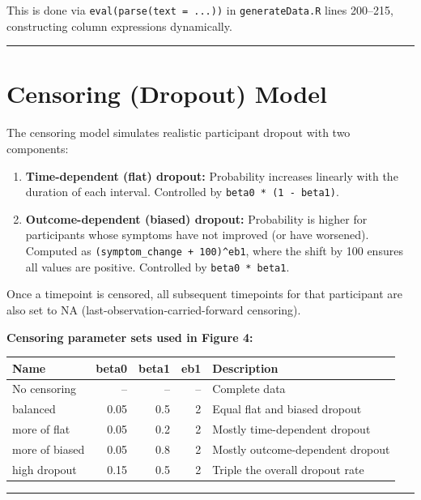 \documentclass[11pt]{article}
\begin{document}
This is done via \texttt{eval(parse(text = ...))} in \texttt{generateData.R}
lines 200--215, constructing column expressions dynamically.

\bigskip\noindent\rule{\textwidth}{0.4pt}\bigskip

\section{Censoring (Dropout) Model}

The censoring model simulates realistic participant dropout
with two components:

\begin{enumerate}
  \item \textbf{Time-dependent (flat) dropout:} Probability increases
    linearly with the duration of each interval. Controlled
    by \texttt{beta0 * (1 - beta1)}.
  \item \textbf{Outcome-dependent (biased) dropout:} Probability is
    higher for participants whose symptoms have not improved
    (or have worsened). Computed as \texttt{(symptom\_change + 100)\^{}eb1},
    where the shift by 100 ensures all values are positive.
    Controlled by \texttt{beta0 * beta1}.
\end{enumerate}

Once a timepoint is censored, all subsequent timepoints for that
participant are also set to NA (last-observation-carried-forward
censoring).

\textbf{Censoring parameter sets used in Figure 4:}

\begin{table}[h]
\centering
\begin{tabular}{lrrrl}
\toprule
Name & beta0 & beta1 & eb1 & Description \\
\midrule
No censoring & -- & -- & -- & Complete data \\
balanced & 0.05 & 0.5 & 2 & Equal flat and biased dropout \\
more of flat & 0.05 & 0.2 & 2 & Mostly time-dependent dropout \\
more of biased & 0.05 & 0.8 & 2 & Mostly outcome-dependent dropout \\
high dropout & 0.15 & 0.5 & 2 & Triple the overall dropout rate \\
\bottomrule
\end{tabular}
\end{table}

\bigskip\noindent\rule{\textwidth}{0.4pt}\bigskip
\end{document}
